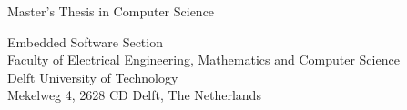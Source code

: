 \begin{titlepage}

  \begin{center}
  \null\vfill
    \begin{center}
    \LARGE{\reportTitle}
    \end{center}

    \vspace{3cm}

    \begin{large}
    Master's Thesis in Computer Science
    \end{large}

    \vspace{1.5cm}

    \begin{normalsize}
    Embedded Software Section\\
    Faculty of Electrical Engineering, Mathematics and Computer Science\\
    Delft University of Technology\\
    Mekelweg 4, 2628 CD Delft, The Netherlands
    \end{normalsize}

    \vspace{2.0cm}

    \begin{normalsize}
    \reportAuthor \\
    \reportUrlEmail
    \end{normalsize}

    \vspace{1.0cm}

    \reportDate             %

  \vfill
  \end{center}

\end{titlepage}
